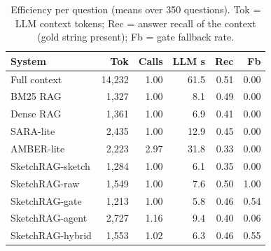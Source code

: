 \begin{table}[t]
\centering
\caption{Efficiency per question (means over 350 questions). Tok = LLM context tokens; Rec = answer recall of the context (gold string present); Fb = gate fallback rate.}
\label{tab:eff}
\setlength{\tabcolsep}{3.4pt}
\begin{tabular}{lrrrrr}
\toprule
System & Tok & Calls & LLM s & Rec & Fb \\
\midrule
Full context & 14{,}232 & 1.00 & 61.5 & 0.51 & 0.00 \\
BM25 RAG & 1{,}327 & 1.00 & 8.1 & 0.49 & 0.00 \\
Dense RAG & 1{,}361 & 1.00 & 6.9 & 0.41 & 0.00 \\
SARA-lite & 2{,}435 & 1.00 & 12.9 & 0.45 & 0.00 \\
AMBER-lite & 2{,}223 & 2.97 & 31.8 & 0.33 & 0.00 \\
SketchRAG-sketch & 1{,}284 & 1.00 & 6.1 & 0.35 & 0.00 \\
SketchRAG-raw & 1{,}549 & 1.00 & 7.6 & 0.50 & 1.00 \\
SketchRAG-gate & 1{,}213 & 1.00 & 5.8 & 0.46 & 0.54 \\
SketchRAG-agent & 2{,}727 & 1.16 & 9.4 & 0.40 & 0.06 \\
SketchRAG-hybrid & 1{,}553 & 1.02 & 6.3 & 0.46 & 0.55 \\
\bottomrule
\end{tabular}
\end{table}